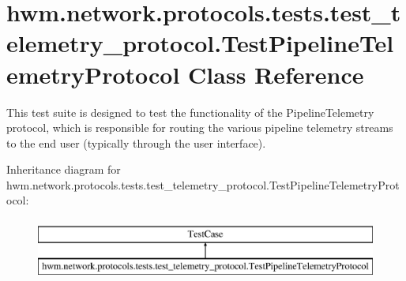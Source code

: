 \hypertarget{classhwm_1_1network_1_1protocols_1_1tests_1_1test__telemetry__protocol_1_1_test_pipeline_telemetry_protocol}{\section{hwm.\-network.\-protocols.\-tests.\-test\-\_\-telemetry\-\_\-protocol.\-Test\-Pipeline\-Telemetry\-Protocol Class Reference}
\label{classhwm_1_1network_1_1protocols_1_1tests_1_1test__telemetry__protocol_1_1_test_pipeline_telemetry_protocol}
}


This test suite is designed to test the functionality of the Pipeline\-Telemetry protocol, which is responsible for routing the various pipeline telemetry streams to the end user (typically through the user interface).  


Inheritance diagram for hwm.\-network.\-protocols.\-tests.\-test\-\_\-telemetry\-\_\-protocol.\-Test\-Pipeline\-Telemetry\-Protocol\-:\begin{figure}[H]
\begin{center}
\leavevmode
\includegraphics[height=2.000000cm]{classhwm_1_1network_1_1protocols_1_1tests_1_1test__telemetry__protocol_1_1_test_pipeline_telemetry_protocol}
\end{center}
\end{figure}

